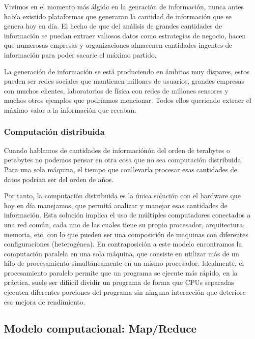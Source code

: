 Vivimos en el momento m\'as \'algido en la genraci\'on de informaci\'on, nunca antes había existido plataformas que generaran la cantidad de información que se genera hoy en d\'ia. El hecho de que del análisis de grandes cantidades de información se puedan extraer valiosos datos como estrategias de negocio, hacen que numerosas empresas y organizaciones almacenen cantidades ingentes de información para poder sacarle el máximo partido.

La generaci\'on de informaci\'on se est\'a produciendo en \'ambitos muy dispares, estos pueden ser redes sociales que mantienen millones de usuarios, grandes empresas con muchos clientes, laboratorios de f\'isica con redes de millones sensores y muchos otros ejemplos que podríamos mencionar. Todos ellos queriendo extraer el máximo valor a la información que recaban.

\subsubsection{Computaci\'on distribuida}

Cuando hablamos de cantidades de información\'on del orden de terabytes o petabytes no podemos pensar en otra cosa que no sea computación distribuida. Para una sola m\'aquina, el tiempo que conllevar\'ia procesar esas cantidades de datos podr\'ian ser del orden de a\~nos.

Por tanto, la computaci\'on distribuida es la \'unica soluci\'on con el hardware que hoy en d\'ia manejamos, que permit\'a analizar y manejar esas cantidades de información. Esta soluci\'on implica el uso de m\'ultiples computadores conectados a una red común, cada uno de las cuales tiene su propio procesador, arquitectura, memoria, etc, con lo que pueden ser una composición de maquinas con diferentes configuraciones (heterog\'enea). En contraposici\'on a este modelo encontramos la computaci\'on paralela en una sola m\'aquina, que consiste en utilizar m\'as de un hilo de procesamiento simult\'aneamente en un mismo procesador. Idealmente, el procesamiento paralelo permite que un programa se ejecute m\'as r\'apido, en la pr\'actica, suele ser difi\'icil dividir un programa de forma que CPUs separadas ejecuten diferentes porciones del programa sin ninguna interacci\'on que deteriore esa mejora de rendimiento.

\subsection{Modelo computacional: Map/Reduce}

